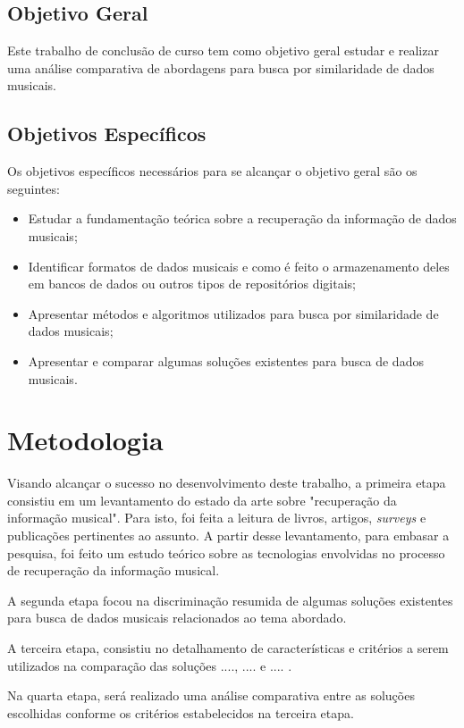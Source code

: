 \subsection{Objetivo Geral}
Este trabalho de conclusão de curso tem como objetivo geral estudar e realizar uma análise comparativa de abordagens para busca por similaridade de dados musicais.

\subsection{Objetivos Específicos}
Os objetivos específicos necessários para se alcançar o objetivo geral são os seguintes:

 \begin{itemize}
   \item Estudar a fundamentação teórica sobre a recuperação da informação de dados musicais;
   \item Identificar formatos de dados musicais e como é feito o armazenamento deles em bancos de dados ou outros tipos de repositórios digitais;
   \item Apresentar métodos e algoritmos utilizados para busca por similaridade de dados musicais;
   \item Apresentar e comparar algumas soluções existentes para busca de dados musicais.
 \end{itemize}

\section{Metodologia}
Visando alcançar o sucesso no desenvolvimento deste trabalho, a primeira etapa consistiu em um levantamento do estado da arte sobre "recuperação da informação musical". Para isto, foi feita a leitura de livros, artigos, \textit{surveys} e publicações pertinentes ao assunto. A partir desse levantamento, para embasar a pesquisa, foi feito um estudo teórico sobre as tecnologias envolvidas no processo de recuperação da informação musical.

A segunda etapa focou na discriminação resumida de algumas soluções existentes para busca de dados musicais relacionados ao tema abordado.

A terceira etapa, consistiu no detalhamento de características e critérios a serem utilizados na comparação das soluções ....,  .... e .... .

Na quarta etapa, será realizado uma análise comparativa entre as soluções escolhidas conforme os critérios estabelecidos na terceira etapa.

